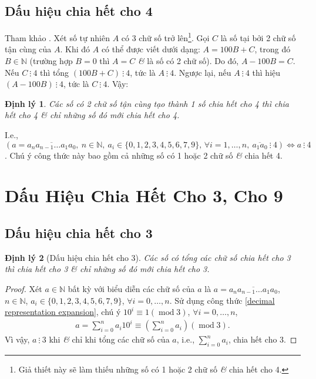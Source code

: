 \documentclass[oneside]{book}
\numberwithin{equation}{section}
\newtheorem{dinhly}{Định lý}[section]
\begin{document}
\subsection{Dấu hiệu chia hết cho 4}
Tham khảo \cite[p. 37]{Thai_Anh_Dat_Ha_Loan_Nam_Quang_Toan_6_tap_1}. Xét số tự nhiên $A$ có 3 chữ số trở lên\footnote{Giả thiết này sẽ làm thiếu những số có 1 hoặc 2 chữ số \textit{\&} chia hết cho 4.}. Gọi $C$ là số tại bởi 2 chữ số tận cùng của $A$. Khi đó $A$ có thể được viết dưới dạng: $A = 100B + C$, trong đó $B\in\mathbb{N}$ (trường hợp $B = 0$ thì $A = C$ \textit{\&} là số có 2 chữ số). Do đó, $A - 100B = C$. Nếu $C\ \vdots\ 4$ thì tổng $(100B + C)\ \vdots\ 4$, tức là $A\ \vdots\ 4$. Ngược lại, nếu $A\ \vdots\ 4$ thì hiệu $(A - 100B)\ \vdots\ 4$, tức là $C\ \vdots\ 4$. Vậy:

\begin{dinhly}
	Các số có 2 chữ số tận cùng tạo thành 1 số chia hết cho 4 thì chia hết cho 4 \textit{\&} chỉ những số đó mới chia hết cho 4.
\end{dinhly}
I.e., $(a = \overline{a_na_{n-1}\ldots a_1a_0},\ n\in\mathbb{N},\ a_i\in\{0,1,2,3,4,5,6,7,9\},\,\forall i = 1,\ldots,n,\ \overline{a_1a_0}\ \vdots\ 4)\Leftrightarrow a\ \vdots\ 4$. Chú ý công thức này bao gồm cả những số có 1 hoặc 2 chữ số \textit{\&} chia hết 4.


\section{Dấu Hiệu Chia Hết Cho 3, Cho 9}

\subsection{Dấu hiệu chia hết cho 3}

\begin{dinhly}[Dấu hiệu chia hết cho 3]
	Các số có tổng các chữ số chia hết cho 3 thì chia hết cho 3 \textit{\&} chỉ những số đó mới chia hết cho 3.
\end{dinhly}

\begin{proof}[Proof]
	Xét $a\in\mathbb{N}$ bất kỳ với biểu diễn các chữ số của $a$ là $a = \overline{a_na_{n-1}\ldots a_1a_0}$, $n\in\mathbb{N}$, $a_i\in\{0,1,2,3,4,5,6,7,9\}$, $\forall i = 0,\ldots,n$. Sử dụng công thức \eqref{decimal representation expansion}, chú ý $10^i\equiv 1(\operatorname{mod} 3)$, $\forall i = 0,\ldots,n$,
	\begin{align*}
		a = \sum_{i=0}^n a_i10^i\equiv\left(\sum_{i=0}^n a_i\right)(\operatorname{mod} 3).
	\end{align*}
	Vì vậy, $a\ \vdots\ 3$ khi \textit{\&} chỉ khi tổng các chữ số của $a$, i.e., $\sum_{i=0}^n a_i$, chia hết cho 3.
\end{proof}
\end{document}
